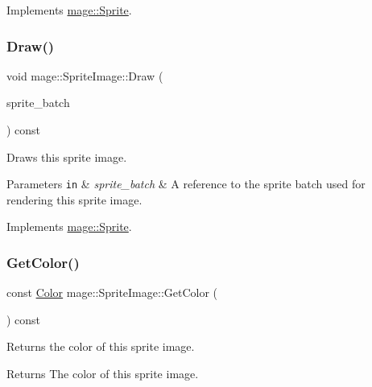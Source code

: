Implements \hyperlink{classmage_1_1_sprite_a214890d7da493bccadb2327b8c7ffb09}{mage\+::\+Sprite}.

\hypertarget{classmage_1_1_sprite_image_ae30d3293931f674fea17008063755bb6}{}\label{classmage_1_1_sprite_image_ae30d3293931f674fea17008063755bb6} 
\subsubsection{\texorpdfstring{Draw()}{Draw()}}
{\footnotesize\ttfamily void mage\+::\+Sprite\+Image\+::\+Draw (\begin{DoxyParamCaption}\item[{\hyperlink{classmage_1_1_sprite_batch}{Sprite\+Batch} \&}]{sprite\+\_\+batch }\end{DoxyParamCaption}) const\hspace{0.3cm}{\ttfamily [virtual]}}

Draws this sprite image.


\begin{DoxyParams}[1]{Parameters}
\mbox{\tt in}  & {\em sprite\+\_\+batch} & A reference to the sprite batch used for rendering this sprite image. \\
\hline
\end{DoxyParams}


Implements \hyperlink{classmage_1_1_sprite_a954a9f2046edcd6b1658a236ae23ec5a}{mage\+::\+Sprite}.

\hypertarget{classmage_1_1_sprite_image_aa04711b85cbe98493edd8767ac3348b5}{}\label{classmage_1_1_sprite_image_aa04711b85cbe98493edd8767ac3348b5} 
\subsubsection{\texorpdfstring{Get\+Color()}{GetColor()}}
{\footnotesize\ttfamily const \hyperlink{structmage_1_1_color}{Color} mage\+::\+Sprite\+Image\+::\+Get\+Color (\begin{DoxyParamCaption}{ }\end{DoxyParamCaption}) const\hspace{0.3cm}{\ttfamily [noexcept]}}

Returns the color of this sprite image.

\begin{DoxyReturn}{Returns}
The color of this sprite image. 
\end{DoxyReturn}
\hypertarget{classmage_1_1_sprite_image_a65e6a26e2589afa2c6ccc463e7dd4264}{}\label{classmage_1_1_sprite_image_a65e6a26e2589afa2c6ccc463e7dd4264} 
